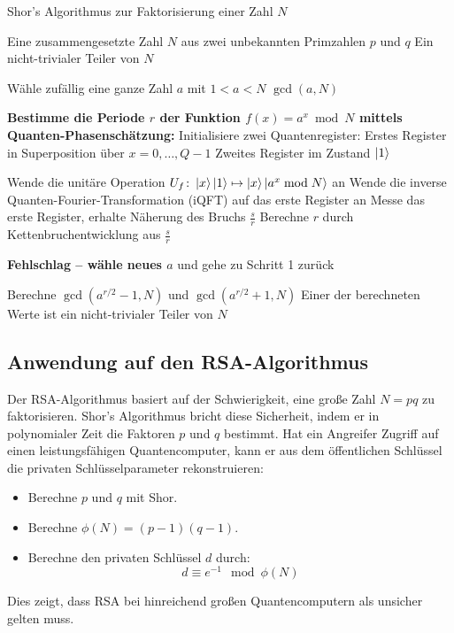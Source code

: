 \begin{algorithm}[H]
\caption{Shor's Algorithmus zur Faktorisierung einer Zahl \( N \)}
\label{algorithm:shor}
\begin{algorithmic}[1]
\Require Eine zusammengesetzte Zahl \( N \) aus zwei unbekannten Primzahlen \( p \) und \( q \)
\Ensure Ein nicht-trivialer Teiler von \( N \)

\State Wähle zufällig eine ganze Zahl \( a \) mit \( 1 < a < N \)
    \State \Return \( \gcd(a, N) \) 
\EndIf

\State \textbf{Bestimme die Periode \( r \) der Funktion \( f(x) = a^x \bmod N \) mittels Quanten-Phasenschätzung:}
\State \hspace{1em} Initialisiere zwei Quantenregister:
\State \hspace{2em} Erstes Register in Superposition über \( x = 0, \ldots, Q-1 \)
\State \hspace{2em} Zweites Register im Zustand \( \ket{1} \)

\State Wende die unitäre Operation \( U_f \colon \ket{x}\ket{1} \mapsto \ket{x}\ket{a^x \bmod N} \) an
\State Wende die inverse Quanten-Fourier-Transformation (iQFT) auf das erste Register an
\State Messe das erste Register, erhalte Näherung des Bruchs \( \frac{s}{r} \)
\State Berechne \( r \) durch Kettenbruchentwicklung aus \( \frac{s}{r} \)

    \State \Return \textbf{Fehlschlag – wähle neues \( a \)} und gehe zu Schritt 1 zurück
\EndIf

\State Berechne \( \gcd(a^{r/2} - 1, N) \) und \( \gcd(a^{r/2} + 1, N) \)
\State \Return Einer der berechneten Werte ist ein nicht-trivialer Teiler von \( N \)
\end{algorithmic}
\end{algorithm}

\subsection{Anwendung auf den RSA-Algorithmus}

\noindent
Der RSA-Algorithmus basiert auf der Schwierigkeit, eine große Zahl \( N = pq \) zu faktorisieren. Shor’s Algorithmus bricht diese Sicherheit, indem er in polynomialer Zeit die Faktoren \( p \) und \( q \) bestimmt. Hat ein Angreifer Zugriff auf einen leistungsfähigen Quantencomputer, kann er aus dem öffentlichen Schlüssel die privaten Schlüsselparameter rekonstruieren:
\begin{itemize}
  \item Berechne \( p \) und \( q \) mit Shor.
  \item Berechne \( \phi(N) = (p-1)(q-1) \).
  \item Berechne den privaten Schlüssel \( d \) durch:
  \[
  d \equiv e^{-1} \mod \phi(N)
  \]
\end{itemize}
Dies zeigt, dass RSA bei hinreichend großen Quantencomputern als unsicher gelten muss.

